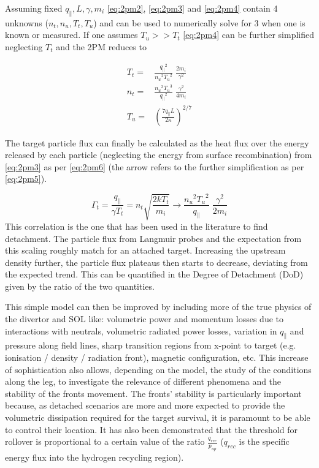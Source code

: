 Assuming fixed $q_{\parallel}, L, \gamma, m_i$ \autoref{eq:2pm2}, \ref{eq:2pm3} and \ref{eq:2pm4} contain 4 unknowns ($n_t, n_u, T_t, T_u$) and can be used to numerically solve for 3 when one is known or measured. If one assumes $T_u >> T_t$ %
\autoref{eq:2pm4} can be further simplified neglecting $T_t$ and the 2PM reduces to

\begin{equation}
\begin{aligned}
T_t =& \frac{{q_{\parallel}}^2}{{n_u}^2 {T_u}^2} \; \frac{2m_i}{\gamma^2} \\
n_t =& \frac{{n_u}^3 {T_u}^3}{{q_{\parallel}}^2} \; \frac{\gamma^2}{4m_i} \\
T_u =& \left( \frac{7 q_{\parallel} L}{2 \kappa} \right)^{2/7}
\end{aligned}
\label{eq:2pm5}
\end{equation}

The target particle flux can finally be calculated as the heat flux over the energy released by each particle (neglecting the energy from surface recombination) from \autoref{eq:2pm3} as per \autoref{eq:2pm6} (the arrow refers to the further simplification as per \autoref{eq:2pm5}).

\begin{equation}
\Gamma_t = \frac{q_{\parallel}}{\gamma T_t} =  n_t \sqrt{\frac{2kT_t}{m_i}} \rightarrow \frac{{n_u}^2 {T_u}^2}{q_{\parallel}} \; \frac{\gamma^2}{2m_i}
\label{eq:2pm6}
\end{equation}
This correlation is the one that has been used in the literature to find detachment. The particle flux from Langmuir probes and the expectation from this scaling roughly match for an attached target. Increasing the upstream density further, the particle flux plateaus then starts to decrease, deviating from the expected trend. This can be quantified in the Degree of Detachment (DoD) given by the ratio of the two quantities.\cite{Stangeby2001,Loarte1998}

This simple model can then be improved by including more of the true physics of the divertor and SOL like: volumetric power and momentum losses due to interactions with neutrals, volumetric radiated power losses, variation in $q_{\parallel}$ and pressure along field lines, sharp transition regions from x-point to target (e.g. ionisation / density / radiation front), magnetic configuration, etc.\cite{Stangeby2001,Cowley2022,Reinke2017,Lipschultz2016} This increase of sophistication also allows, depending on the model, the study of the conditions along the leg, to investigate the relevance of different phenomena and the stability of the fronts movement. The fronts' stability is particularly important because, as detached scenarios are more and more expected to provide the volumetric dissipation required for the target survival, it is paramount to be able to control their location. It has also been demonstrated that the threshold for rollover is proportional to a certain value of the ratio $ \frac {q_{rec}} {p_{up}}$ ($q_{rec}$ is the speciﬁc energy ﬂux into the hydrogen recycling region). \cite{Krasheninnikov1999,Krasheninnikov2016,Stangeby2018}

